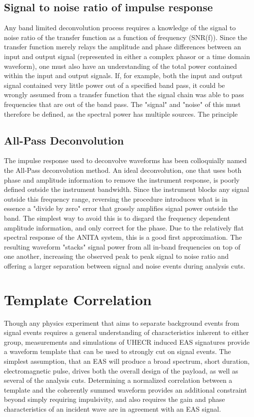 	\subsection{Signal to noise ratio of impulse response}
		Any band limited deconvolution process requires a knowledge of the signal to noise ratio of the transfer function as a function of frequency (SNR(f)).  Since the transfer function merely relays the amplitude and phase differences between an input and output signal (represented in either a complex phasor or a time domain waveform), one must also have an understanding of the total power contained within the input and output signals.  If, for example, both the input and output signal contained very little power out of a specified band pass, it could be wrongly assumed from a transfer function that the signal chain was able to pass frequencies that are out of the band pass.
		The "signal" and "noise" of this must therefore be defined, as the spectral power has multiple sources.  The principle   
	\subsection{All-Pass Deconvolution}
		The impulse response used to deconvolve waveforms has been colloquially named the All-Pass deconvolution method.  An ideal deconvolution, one that uses both phase and amplitude information to remove the instrument response, is poorly defined outside the instrument bandwidth.  Since the instrument blocks any signal outside this frequency range, reversing the procedure introduces what is in essence a "divide by zero" error that grossly amplifies signal power outside the band.  The simplest way to avoid this is to disgard the frequency dependent amplitude information, and only correct for the phase.  Due to the relatively flat spectral response of the ANITA system, this is a good first approximation.  The resulting waveform "stacks" signal power from all in-band frequencies on top of one another, increasing the observed peak to peak signal to noise ratio and offering a larger separation between signal and noise events during analysis cuts.



\section{Template Correlation}
	Though any physics experiment that aims to separate background events from signal events requires a general understanding of characteristics inherent to either group, measurements and simulations of UHECR induced EAS signatures provide a waveform template that can be used to strongly cut on signal events.  The simplest assumption, that an EAS will produce a broad spectrum, short duration, electromagnetic pulse, drives both the overall design of the payload, as well as several of the analysis cuts.  Determining a normalized correlation between a template and the coherently summed waveform provides an additional constraint beyond simply requiring impulsivity, and also requires the gain and phase characteristics of an incident wave are in agreement with an EAS signal.
	
